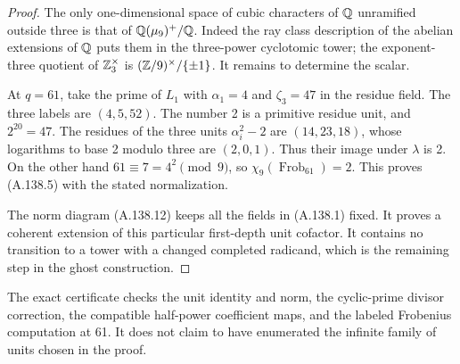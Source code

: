 \begin{proof}
The only one-dimensional space of cubic
characters of \(\mathbb Q\) unramified outside
three is that of
\(\mathbb Q(\mu_9)^+/\mathbb Q\).
Indeed the ray class description of the
abelian extensions of \(\mathbb Q\)
\cite[I, Theorem 4.16 and V, Example 3.10]{MilneCFT}
puts them in the three-power cyclotomic tower;
the exponent-three quotient of
\(\mathbb Z_3^\times\) is
\((\mathbb Z/9)^\times/\{\pm1\}\).
It remains to determine the scalar.

At \(q=61\), take the prime of \(L_1\) with
\(\alpha_1=4\) and \(\zeta_3=47\) in the
residue field.
The three labels are \((4,5,52)\).
The number 2 is a primitive residue unit,
and \(2^{20}=47\).
The residues of the three units
\(\alpha_i^2-2\) are
\((14,23,18)\), whose logarithms to base 2
modulo three are \((2,0,1)\).
Thus their image under \(\lambda\) is 2.
On the other hand \(61\equiv7=4^2\pmod9\),
so \(\chi_9(\operatorname{Frob}_{61})=2\).
This proves (A.138.5) with the stated
normalization.

The norm diagram (A.138.12) keeps all the
fields in (A.138.1) fixed.
It proves a coherent extension of this
particular first-depth unit cofactor.
It contains no transition to a tower with
a changed completed radicand, which is
the remaining step in the ghost construction.
\end{proof}

The exact certificate
checks the unit identity and norm, the
cyclic-prime divisor correction, the compatible
half-power coefficient maps, and the labeled
Frobenius computation at 61.
It does not claim to have enumerated the
infinite family of units chosen in the proof.
